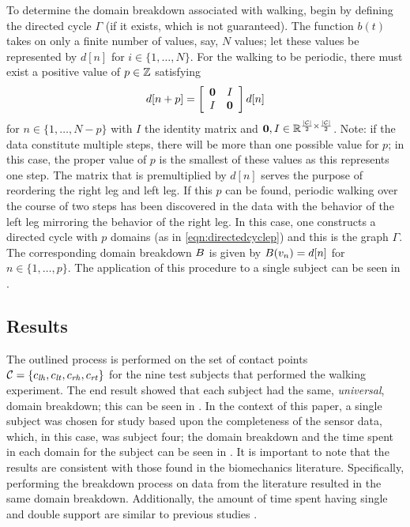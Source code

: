 To determine the domain breakdown associated with walking, begin by defining the directed cycle $\Gamma$ (if it exists, which is not guaranteed). The function $b(t)$ takes on only a finite number of values, say, $N$ values; let these values be represented by $d[n]$ for $i \in \{1, \ldots, N\}$. For the walking to be periodic, there must exist a positive value of $p \in \mathbb{Z}$ satisfying
\begin{align}
  \label{eq:dstep}
  d[n + p] =
  \left[\begin{array}{c c}
      {\mathbf 0} & I\\
      I & {\mathbf 0}
    \end{array}\right] d[n]
\end{align}
for $n \in \{1, \ldots, N-p\}$ with $I$ the identity matrix and ${\mathbf 0}, I \in \mathbb{R}^{\frac{|\mathcal{C}|}{2} \times \frac{|\mathcal{C}|}{2}}$. Note: if the data constitute multiple steps, there will be more than one possible value for $p$; in this case, the proper value of $p$ is the smallest of these values as this represents one step. The matrix that is premultiplied by $d[n]$ serves the purpose of reordering the right leg and left leg.  If this $p$ can be found, periodic walking over the course of two steps has been discovered in the data with the behavior of the left leg mirroring the behavior of the right leg. In this case, one constructs a directed cycle with $p$ domains (as in \eqref{eqn:directedcyclep}) and this is the graph $\Gamma$. The corresponding domain breakdown $B$ is given by $B(v_{n}) = d[n]$ for $n \in \{1, \ldots, p\}$. The application of this procedure to a single subject can be seen in .

\subsection{Results} The outlined process is performed on the set of contact
points $\mathcal{C} =  \{c_{\mathit{lh}}, c_{\mathit{lt}}, c_{\mathit{rh}} , c_{\mathit{rt}}\}$ for the nine test subjects that
performed the walking experiment. The end result showed that each subject had
the same, {\em universal}, domain breakdown; this can be seen in
. In the context of this paper, a single subject was
chosen for study based upon the completeness of the sensor data, which, in this
case, was subject four; the domain breakdown and the time spent in each domain
for the subject can be seen in . It is important to note that the
results are consistent with those found in the biomechanics
literature. Specifically, performing the breakdown process on data from the
literature \cite{Winter2009} resulted in the same domain breakdown. Additionally,
the amount of time spent having single and double support are similar to
previous studies \cite{Ackermann2007}.

